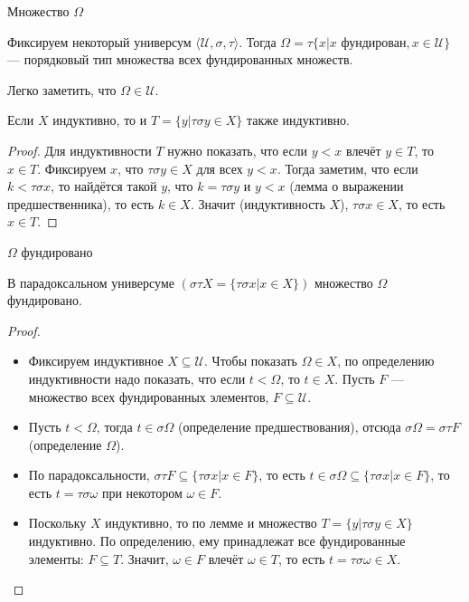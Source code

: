 \documentclass[aspectratio=169,dvipsnames,usenames]{beamer}
\begin{document}
\begin{frame}{Множество $\Omega$}
\begin{definition} Фиксируем некоторый универсум $\langle\mathcal{U},\sigma,\tau\rangle$. Тогда $\Omega = \tau\{x | x \text{ фундирован}, x\in\mathcal{U}\}$ --- 
порядковый тип множества всех фундированных множеств.
\end{definition}

Легко заметить, что $\Omega\in\mathcal{U}$.

\begin{lmm}Если $X$ индуктивно, то и $T = \{y | \tau\sigma y \in X\}$ также индуктивно.\end{lmm}
\begin{proof}
Для индуктивности $T$ нужно показать, что если $y < x$ влечёт $y \in T$, то $x \in T$.
Фиксируем $x$, что $\tau\sigma y \in X$ для всех $y < x$.
Тогда заметим, что если $k < \tau\sigma x$, то найдётся такой $y$, что $k = \tau\sigma y$ и $y < x$
(лемма о выражении предшественника), то есть $k \in X$. Значит (индуктивность $X$), $\tau\sigma x \in X$, то есть $x \in T$.
\end{proof}


\end{frame}

\begin{frame}{$\Omega$ фундировано}
\begin{lmm} В парадоксальном универсуме $(\sigma\tau X = \{\tau\sigma x| x \in X\})$ множество $\Omega$ фундировано.
\end{lmm}
\begin{proof}
\begin{itemize}
\item Фиксируем индуктивное $X \subseteq \mathcal{U}$. Чтобы показать $\Omega \in X$, по определению индуктивности надо показать, что если $t < \Omega$, то $t \in X$.
Пусть $F$ --- множество всех фундированных элементов, $F \subseteq \mathcal{U}$.

\item Пусть $t < \Omega$, тогда $t \in \sigma\Omega$ (определение предшествования), 
отсюда $\sigma\Omega = \sigma\tau F$
(определение $\Omega$).

\item По парадоксальности, $\sigma\tau F \subseteq \{\tau\sigma x| x \in F\}$, то есть $t \in \sigma\Omega \subseteq \{\tau\sigma x | x \in F\}$,
то есть $t = \tau\sigma\omega$ при некотором $\omega \in F$.

\item Поскольку $X$ индуктивно, то по лемме и множество $T = \{y | \tau\sigma y \in X\}$ индуктивно. По определению, ему принадлежат все фундированные элементы: $F \subseteq T$.
Значит, $\omega \in F$ влечёт $\omega \in T$, то есть $t = \tau\sigma\omega \in X$.

\end{itemize}
\end{proof}
\end{frame}
\end{document}
